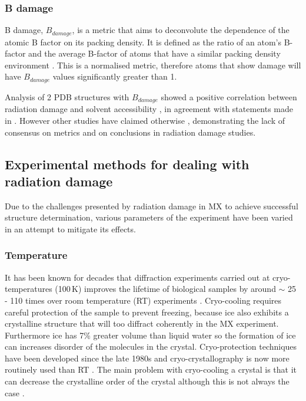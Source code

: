         \subsubsection{B damage}
        \label{subs:B damage}
            B damage, $B_{damage}$, is a metric that aims to deconvolute the dependence of the atomic B factor on its packing density.
			It is defined as the ratio of an atom's B-factor and the average B-factor of atoms that have a similar packing density environment \cite{gerstel2015identifying}.
			This is a normalised metric, therefore atoms that show damage will have $B_{damage}$ values significantly greater than 1.

        Analysis of 2 PDB structures with $B_{damage}$ showed a positive correlation between radiation damage and solvent accessibility \cite{gerstel2015identifying}, in agreement with statements made in \cite{sygusch1988}.
		However other studies have claimed otherwise \cite{coquelle2007activity,homer2011energy}, demonstrating the lack of consensus on metrics and on conclusions in radiation damage studies.

    \subsection{Experimental methods for dealing with radiation damage}
    \label{sub:Experimental methods for dealing with radiation damage}
        Due to the challenges presented by radiation damage in MX to achieve successful structure determination, various parameters of the experiment have been varied in an attempt to mitigate its effects.

        \subsubsection{Temperature}
        \label{subs:Temperature}
            It has been known for decades that diffraction experiments carried out at cryo-temperatures (100\,K) improves the lifetime of biological samples \cite{haas1970crystallographic,henderson1990cryo,brooks2015nobel} by around $\sim$ 25 - 110 times over room temperature (RT) experiments \cite{south2007}.
            Cryo-cooling requires careful protection of the sample to prevent freezing, because ice also exhibits a crystalline structure that will too diffract coherently in the MX experiment.
            Furthermore ice has 7\% greater volume than liquid water so the formation of ice can increases disorder of the molecules in the crystal.
            Cryo-protection techniques have been developed since the late 1980s \cite{garman1997macromolecular,hope1988cryocrystallography,teng1990mounting} and cryo-crystallography is now more routinely used than RT \cite{garman2014}.
            The main problem with cryo-cooling a crystal is that it can decrease the crystalline order of the crystal \cite{nave2005} although this is not always the case \cite{garman1999cool}.

